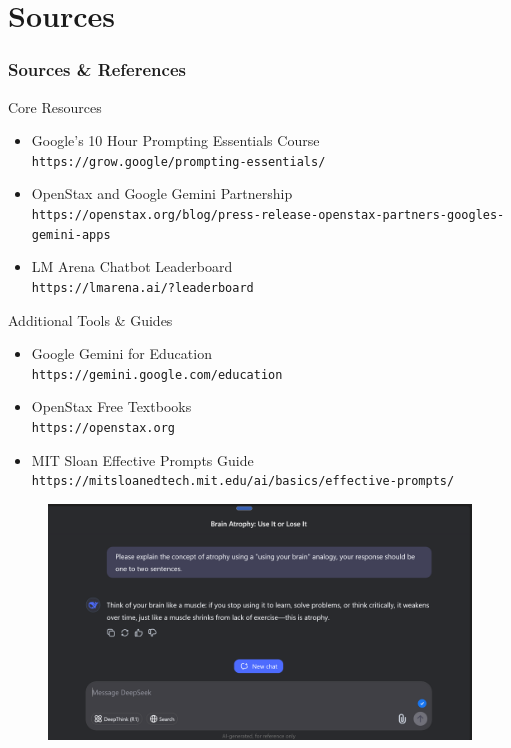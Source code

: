 \documentclass{beamer}
\begin{document}
\section{Sources}
\frame{\sectionpage}

\begin{frame}[allowframebreaks]
\frametitle{Sources \& References}

\begin{block}{Core Resources}
\begin{itemize}
\item Google's 10 Hour Prompting Essentials Course\\
    \texttt{https://grow.google/prompting-essentials/}
\item OpenStax and Google Gemini Partnership\\
    \texttt{https://openstax.org/blog/press-release-openstax-partners-googles-gemini-apps}
\item LM Arena Chatbot Leaderboard\\
    \texttt{https://lmarena.ai/?leaderboard}
\end{itemize}
\end{block}

\begin{block}{Additional Tools \& Guides}
\begin{itemize}
\item Google Gemini for Education\\
    \texttt{https://gemini.google.com/education}
\item OpenStax Free Textbooks\\
    \texttt{https://openstax.org}
\item MIT Sloan Effective Prompts Guide\\
    \texttt{https://mitsloanedtech.mit.edu/ai/basics/effective-prompts/}
\end{itemize}
\end{block}
\end{frame}

\begin{frame}
\begin{figure}
    \centering
    \includegraphics[width=1\linewidth]{image.png}
\end{figure}
\end{frame}
\end{document}

